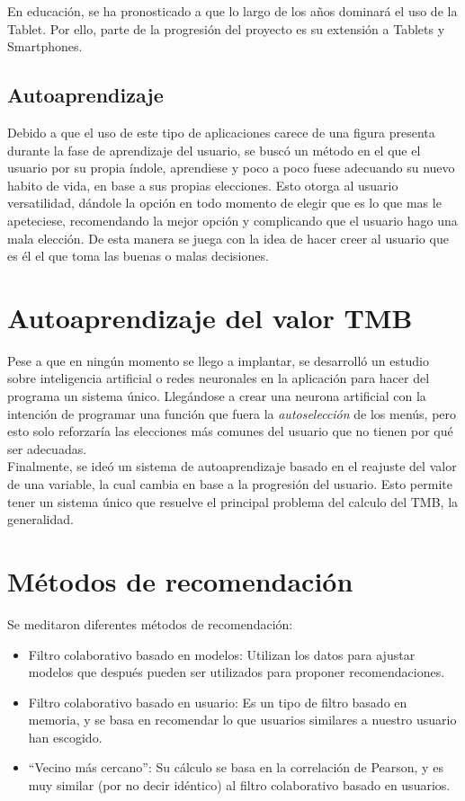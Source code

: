 En educación, se ha pronosticado a que lo largo de los años dominará el uso de la Tablet. Por ello, parte de la progresión del proyecto es su extensión a Tablets y Smartphones. \cite{ensenanza}
\subsection{Autoaprendizaje}
Debido a que el uso de este tipo de aplicaciones carece de una figura presenta durante la fase de aprendizaje del usuario, se buscó un método en el que el usuario por su propia índole, aprendiese y poco a poco fuese adecuando su nuevo habito de vida, en base a sus propias elecciones. Esto otorga al usuario versatilidad, dándole la opción en todo momento de elegir que es lo que mas le apeteciese, recomendando la mejor opción y complicando que el usuario hago una mala elección. De esta manera se juega con la idea de hacer creer al usuario que es él el que toma las buenas o malas decisiones.
\section{Autoaprendizaje del valor TMB}
Pese a que en ningún momento se llego a implantar, se desarrolló un estudio sobre inteligencia artificial o redes neuronales en la aplicación para hacer del programa un sistema único.
Llegándose a crear una neurona artificial con la intención de programar una función que fuera la \textit{autoselección} de los menús, pero esto solo reforzaría las elecciones más comunes del usuario que no tienen por qué ser adecuadas.\\

Finalmente, se ideó un sistema de autoaprendizaje basado en el reajuste del valor de una variable, la cual cambia en base a la progresión del usuario. Esto permite tener un sistema único que resuelve el principal problema del calculo del TMB, la generalidad. \\
\clearpage

\section{Métodos de recomendación}
Se meditaron diferentes métodos de recomendación:
\begin{itemize}
\item	Filtro colaborativo basado en modelos: Utilizan los datos para ajustar modelos que después pueden ser utilizados para proponer recomendaciones.
\item	Filtro colaborativo basado en usuario: Es un tipo de filtro basado en memoria, y se basa en recomendar lo que usuarios similares a nuestro usuario han escogido.
\item	“Vecino más cercano”: Su cálculo se basa en la correlación de Pearson, y es muy similar (por no decir idéntico) al filtro colaborativo basado en usuarios.
\end{itemize}

